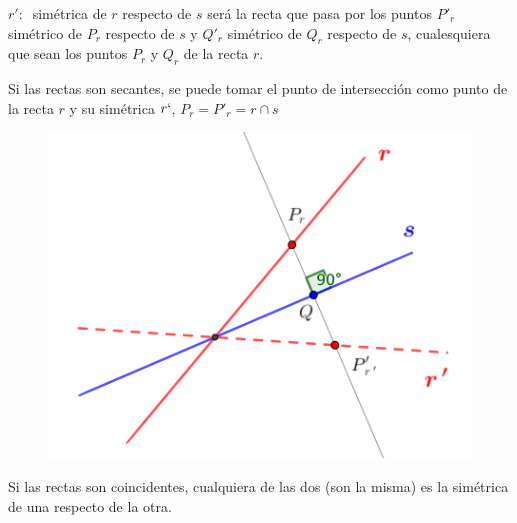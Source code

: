 \vspace{5mm}
\begin{definition}

\begin{multicols}{2}	
	$r': \ $ simétrica de $r$ respecto de $s$ será la recta que pasa por los puntos $P'_r$ simétrico de $P_r$ respecto de $s$ y 	$Q'_r$ simétrico de $Q_r$ respecto de $s$, cualesquiera que sean los puntos $P_r$ y $Q_r$ de la recta $r$.

\vspace{2mm} Si las rectas son secantes, se puede tomar el punto de intersección como punto de la recta $r$ y su simétrica $r`$, $P_r=P'_r=r\cap s$ 
\begin{figure}[H]
	\centering
	\includegraphics[width=.45\textwidth]{img-ga/ga22.png}
\end{figure}
\end{multicols}
\vspace{-5mm} Si las rectas son coincidentes, cualquiera de las dos (son la misma) es la simétrica de una respecto de la otra.
\end{definition}


